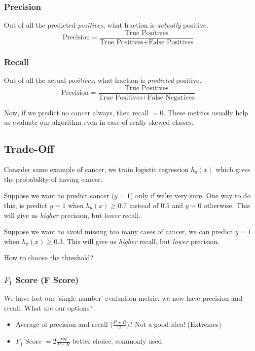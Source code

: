 \subsubsection{Precision}
Out of all the predicted \emph{positives}, what fraction is \emph{actually} positive.
\begin{equation*}
	\text{Precision} = \frac{\text{True Positives}}
	{\text{True Positives} + \text{False Positives}}
\end{equation*}

\subsubsection{Recall}
Out of all the actual \emph{positives}, what fraction is \emph{predicted} positive.
\begin{equation*}
	\text{Precision} = \frac{\text{True Positives}}
	{\text{True Positives} + \text{False Negatives}}
\end{equation*}

Now, if we predict no cancer always, then recall $= 0$. These metrics usually help us
evaluate our algorithm even in case of really skewed classes.

\subsection{Trade-Off}
Consider same example of cancer, we train logistic regression $h_\theta(x)$ which gives
the probability of having cancer.

Suppose we want to predict cancer ($y = 1$) only
if we're very sure. One way to do this, is predict $y = 1$ when $h_\theta(x) \ge 0.7$
instead of $0.5$ and $y = 0$ otherwise. This will give us \emph{higher} precision,
but \emph{lower} recall.

Suppose we want to avoid missing too many cases of cancer, we can predict
$y = 1$ when $h_\theta(x) \ge 0.3$. This will give us \emph{higher} recall,
but \emph{lower} precision.

How to choose the threshold?

\subsubsection{$F_1$ Score (F Score)}
We have lost our 'single number' evaluation metric, we now have precision and recall.
What are our options?
\begin{itemize}
	\item Average of precision and recall ($\frac{P + R}{2}$)?
	      Not a good idea! (Extremes)
	\item $F_1$ Score $= 2\frac{PR}{P+R}$ better choice, commonly used
\end{itemize}

